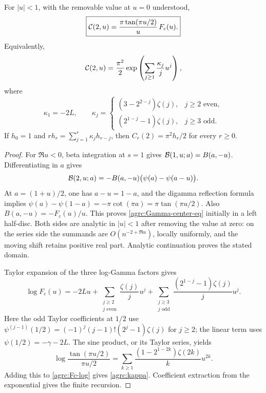 \begin{theorem}
\label{agrc:Gamma-center}
For $|u|<1$, with the removable value at $u=0$ understood,
\begin{equation}\label{agrc:Gamma-center-eq}
 \boxed{\displaystyle
 \mathcal C(2,u)=\frac{\pi\tan(\pi u/2)}{u}\,F_c(u).}
\end{equation}
Equivalently,
\begin{equation}\label{agrc:cumulant-gen}
 \mathcal C(2,u)=\frac{\pi^2}{2}
       \exp\left(\sum_{j\geq1}\frac{\kappa_j}{j}u^j\right),
\end{equation}
where
\begin{equation}\label{agrc:kappa}
 \kappa_1=-2L,\qquad
 \kappa_j=
 \begin{cases}
 (3-2^{2-j})\zeta(j),&j\geq2\text{ even},\\
 (2^{1-j}-1)\zeta(j),&j\geq3\text{ odd}.
 \end{cases}
\end{equation}
If $h_0=1$ and $rh_r=\sum_{j=1}^r\kappa_jh_{r-j}$, then
$C_r(2)=\pi^2h_r/2$ for every $r\geq0$.
\end{theorem}
\begin{proof}
For $\Re u<0$, beta integration at $s=1$ gives
$\mathcal B(1,u;a)=B(a,-u)$. Differentiating in $a$ gives
\[
 \mathcal B(2,u;a)=-B(a,-u)\bigl(\psi(a)-\psi(a-u)\bigr).
\]
At $a=(1+u)/2$, one has $a-u=1-a$, and the digamma reflection formula
implies
$\psi(a)-\psi(1-a)=-\pi\cot(\pi a)=\pi\tan(\pi u/2)$.
Also $B(a,-u)=-F_c(u)/u$. This proves
\eqref{agrc:Gamma-center-eq} initially in a left half-disc. Both sides
are analytic in $|u|<1$ after removing the value at zero: on the series
side the summands are $O(n^{-2+\Re u})$, locally uniformly, and the
moving shift retains positive real part. Analytic continuation proves
the stated domain.

Taylor expansion of the three log-Gamma factors gives
\begin{equation}\label{agrc:Fc-log}
 \log F_c(u)=-2Lu+
 \sum_{\substack{j\geq2\\j\text{ even}}}\frac{\zeta(j)}j u^j
 +\sum_{\substack{j\geq3\\j\text{ odd}}}
          \frac{(2^{1-j}-1)\zeta(j)}j u^j.
\end{equation}
Here the odd Taylor coefficients at $1/2$ use
$\psi^{(j-1)}(1/2)=(-1)^j(j-1)!(2^j-1)\zeta(j)$ for $j\geq2$;
the linear term uses $\psi(1/2)=-\gamma-2L$.
The sine product, or its Taylor series, yields
\[
 \log\frac{\tan(\pi u/2)}{\pi u/2}
 =\sum_{k\geq1}\frac{(1-2^{1-2k})\zeta(2k)}k u^{2k}.
\]
Adding this to \eqref{agrc:Fc-log} gives \eqref{agrc:kappa}.
Coefficient extraction from the exponential gives the finite recursion.
\end{proof}

